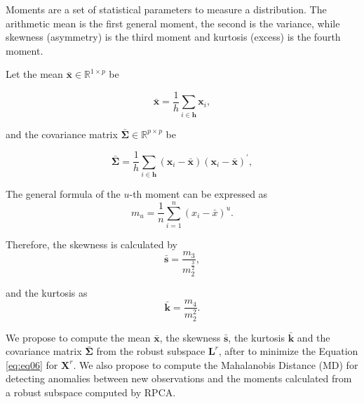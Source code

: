 \documentclass[review]{elsarticle}
\begin{document}
Moments are a set of statistical parameters to measure a distribution. The arithmetic mean is the first general moment, the second is the variance, while skewness (asymmetry) is the third moment and kurtosis (excess) is the fourth moment.

Let the mean $\bar{\boldsymbol{x}} \in \mathbb{R}^{1 \times p}$ be

\begin{equation}\label{eq:eq07}
	\bar{\boldsymbol{x}} = \displaystyle\frac{1}{h}\displaystyle\sum_{i\in \boldsymbol{h}} \boldsymbol{x}_i, 
\end{equation}

and the covariance matrix $\boldsymbol{\bar{\Sigma}} \in \mathbb{R}^{p \times p}$ be

\begin{equation}\label{eq:eq08}
	\boldsymbol{\bar{\Sigma}} = \displaystyle\frac{1}{h}\displaystyle\sum_{i\in \boldsymbol{h}} (\boldsymbol{x}_i - \bar{\boldsymbol{x}})(\boldsymbol{x}_i - \bar{\boldsymbol{x}})^\prime,
\end{equation}

The general formula of the $u$-th moment can be expressed as
\begin{equation}\label{eq:eq09}
	m_u = \displaystyle\frac{1}{n}\displaystyle\sum_{i = 1}^{n}( x_i - \bar{x})^u.
\end{equation}

Therefore, the skewness is calculated by
\begin{equation}\label{eq:eq10}
	\boldsymbol{\bar{s}} = \frac{m_3}{m_2^{\frac{3}{2}}},
\end{equation}

and the kurtosis as
\begin{equation}\label{eq:eq11}
	\boldsymbol{\bar{k}} = \frac{m_4}{m_2^2}.
\end{equation}

We propose to compute the mean $\boldsymbol{\bar{x}}$, the skewness $\boldsymbol{\bar{s}}$, the kurtosis $\boldsymbol{\bar{k}}$ and the covariance matrix $\boldsymbol{\bar{\Sigma}}$ from the robust subspace $\boldsymbol{L}^r$, after to minimize the Equation \ref{eq:eq06} for $\textbf{X}^r$. We also propose to compute the Mahalanobis Distance (MD) for detecting anomalies between new observations and the moments calculated from a robust subspace computed by RPCA. 
\end{document}
